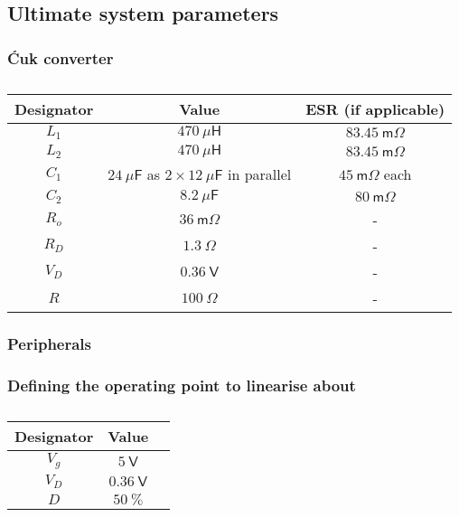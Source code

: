 \subsection{Ultimate system parameters}\label{sec:system_params}
\subsubsection{\'{C}uk converter}
\begin{table}[H]
\centering
\begin{tabular}{|c|c|c|}
\hline
Designator & Value & ESR (if applicable)\\
\hline
$L_1$ & $470 \ \mathsf{\mu H}$ & $83.45 \ \mathsf{m \Omega}$\\
\hline
$L_2$ & $470 \ \mathsf{\mu H}$ & $83.45 \ \mathsf{m \Omega}$\\
\hline
$C_1$ & $24 \ \mathsf{\mu F}$ as $2 \times 12 \ \mathsf{\mu F}$ in parallel & $45 \ \mathsf{m \Omega}$ each\\
\hline
$C_2$ & $8.2 \ \mathsf{\mu F}$ & $80 \ \mathsf{m \Omega}$\\
\hline
$R_o$ & $36 \ \mathsf{m \Omega}$ & -\\
\hline
$R_D$ & $1.3 \ \mathsf{\Omega}$ & -\\
\hline
$V_D$ & $0.36 \ \mathsf{V}$ & -\\
\hline
$R$ & $100 \ \mathsf{\Omega}$ & -\\
\hline
\end{tabular}
\caption{}
\label{tab:cuk_values}
\end{table}
\subsubsection{Peripherals}
\subsubsection{Defining the operating point to linearise about}\label{sec:control_params}
\begin{table}[H]
\centering
\begin{tabular}{|c|c|c|}
\hline
Designator & Value\\
\hline
$V_g$ & $5 \ \mathsf{V}$\\
\hline
$V_D$ & $0.36 \ \mathsf{V}$\\
\hline
$D$ & $50 \ \mathsf{\%}$\\
\hline
\end{tabular}
\caption{}
\label{tab:control_values}
\end{table}
